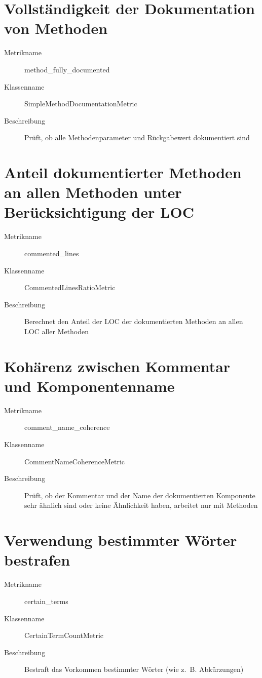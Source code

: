 \begin{appendices}
\section{Vollständigkeit der Dokumentation von Methoden}
\begin{description}
    \item [Metrikname]  method\_fully\_documented
    \item [Klassenname] SimpleMethodDocumentationMetric
    \item[Beschreibung] Prüft, ob alle Methodenparameter und Rückgabewert dokumentiert sind
\end{description}

\section{Anteil dokumentierter Methoden an allen Methoden unter
Berücksichtigung der LOC}
\begin{description}
    \item [Metrikname]  commented\_lines
    \item [Klassenname] CommentedLinesRatioMetric
    \item[Beschreibung]  Berechnet den Anteil der \ac{LOC} der dokumentierten Methoden an allen \ac{LOC} aller Methoden
\end{description}

\section{Kohärenz zwischen Kommentar und
Komponentenname}
\begin{description}
    \item [Metrikname]  comment\_name\_coherence
    \item [Klassenname] CommentNameCoherenceMetric
    \item[Beschreibung]  Prüft, ob der Kommentar und der Name der dokumentierten Komponente sehr ähnlich sind oder keine Ähnlichkeit haben, arbeitet nur mit Methoden
\end{description}

\section{Verwendung bestimmter Wörter bestrafen}
\begin{description}
    \item [Metrikname]  certain\_terms
    \item [Klassenname] CertainTermCountMetric
    \item[Beschreibung]  Bestraft das Vorkommen bestimmter Wörter (wie z.~B. Abkürzungen)
\end{description}


\end{appendices}
